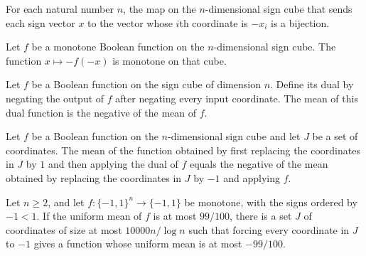 \begin{definition}
\label{FABL.briberyNegateSignCubeEquiv}
\leanok
{}
For each natural number $n$, the map on the $n$-dimensional sign cube that sends each
sign vector $x$ to the vector whose $i$th coordinate is $-x_i$ is a bijection.
\end{definition}

\begin{theorem}
\label{FABL.monotone_dualBooleanFunction}
\leanok
{}
Let $f$ be a monotone Boolean function on the $n$-dimensional sign cube. The function
$x\mapsto -f(-x)$ is monotone on that cube.
\end{theorem}

\begin{theorem}
\label{FABL.mean_dualBooleanFunction}
\leanok
{}
Let $f$ be a Boolean function on the sign cube of dimension $n$. Define its dual by
negating the output of $f$ after negating every input coordinate. The mean of this dual
function is the negative of the mean of $f$.
\end{theorem}

\begin{theorem}
\label{FABL.mean_bribeFunction_dual_one}
\leanok
{}
Let $f$ be a Boolean function on the $n$-dimensional sign cube and let $J$ be a set of
coordinates. The mean of the function obtained by first replacing the coordinates in $J$
by $1$ and then applying the dual of $f$ equals the negative of the mean obtained by
replacing the coordinates in $J$ by $-1$ and applying $f$.
\end{theorem}

\begin{theorem}
\label{FABL.proposition9_27_negative}
\leanok
{}
Let $n\ge 2$, and let $f:\{-1,1\}^n\to\{-1,1\}$ be monotone, with the signs ordered by
$-1<1$. If the uniform mean of $f$ is at most $99/100$, there is a set $J$ of
coordinates of size at most $10000n/\log n$ such that forcing every coordinate in $J$ to
$-1$ gives a function whose uniform mean is at most $-99/100$.
\end{theorem}

